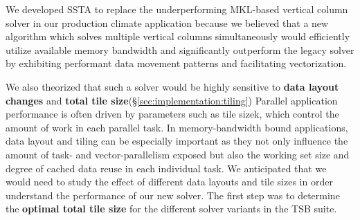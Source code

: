 \documentclass{sig-alternate-05-2015}
\begin{document}
We developed SSTA to replace the underperforming MKL-based vertical column
  solver in our production climate application because we believed that a new
  algorithm which solves multiple vertical columns simultaneously would
  efficiently utilize available memory bandwidth and significantly outperform the
  legacy solver by exhibiting performant data movement patterns and facilitating
  vectorization.

We also theorized that such a solver would be highly sensitive to
  \textbf{data layout changes} and
  \textbf{total tile size}(\S\ref{sec:implementation:tiling})
Parallel application performance is often driven by parameters such as 
  tile sizek, which control the amount of work in each parallel task.
In memory-bandwidth bound applications, data layout and tiling can be
  especially important as they not only influence the amount of task- and
  vector-parallelism exposed but also the working set size and degree of cached
  data reuse in each individual task.
We anticipated that we would need to study the effect of different data layouts
  and tile sizes in order understand the performance of our new solver.
The first step was to determine the \textbf{optimal total tile size} for the 
  different solver variants in the TSB suite.


\end{document}
